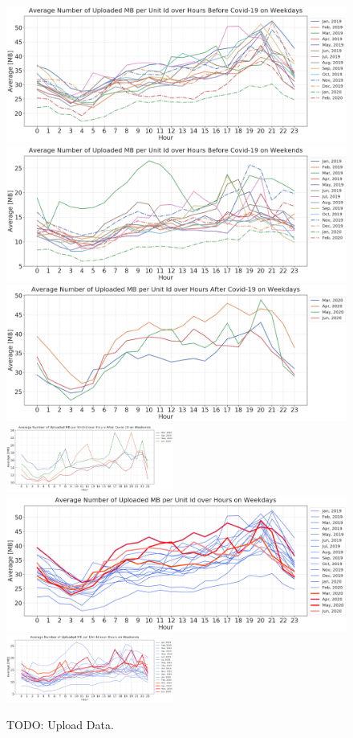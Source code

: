 \documentclass[conference,10pt]{IEEEtran}
\begin{document}
\begin{figure}[t]
  \centering
  \includegraphics[width=.49\textwidth]{figs/wenjun/upload_wdays_before.png}
  \includegraphics[width=.49\textwidth]{figs/wenjun/upload_wends_before.png}
  \includegraphics[width=.49\textwidth]{figs/wenjun/upload_wdays_after.png}
  \includegraphics[width=0.49\textwidth]{figs/wenjun/upload_wends_after.png}
  \includegraphics[width=.49\textwidth]{figs/wenjun/upload_wdays_compare.png}
  \includegraphics[width=0.49\textwidth]{figs/wenjun/upload_wends_compare.png}

  \vspace*{-1em}
  \caption{TODO: Upload Data.}
    \vspace*{-1em}
  \label{fig:upload_data_per_user_hours_fig}  
\end{figure}
\end{document}

